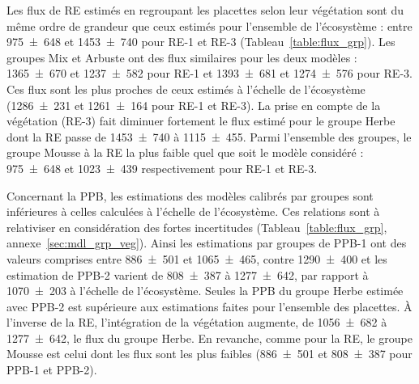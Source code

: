 Les flux de RE estimés en regroupant les placettes selon leur végétation sont du même ordre de grandeur que ceux estimés pour l'ensemble de l'écosystème : entre \num{975(648)} et \SI{1453(740)}{\gcma} pour RE-1 et RE-3 (Tableau~\ref{table:flux_grp}).
Les groupes Mix et Arbuste ont des flux similaires pour les deux modèles : \num{1365(670)} et \SI{1237(582)}{\gcma} pour RE-1 et \num{1393(681)} et \SI{1274(576)}{\gcma} pour RE-3.
Ces flux sont les plus proches de ceux estimés à l'échelle de l'écosystème (\num{1286(231)} et \SI{1261(164)}{\gcma} pour RE-1 et RE-3).
La prise en compte de la végétation (RE-3) fait diminuer fortement le flux estimé pour le groupe Herbe dont la RE passe de \num{1453(740)} à \SI{1115(455)}{\gcma}.
Parmi l'ensemble des groupes, le groupe Mousse à la RE la plus faible quel que soit le modèle considéré : \num{975(648)} et \SI{1023(439)}{\gcma} respectivement pour RE-1 et RE-3.

Concernant la PPB, les estimations des modèles calibrés par groupes sont inférieures à celles calculées à l'échelle de l'écosystème.
Ces relations sont à relativiser en considération des fortes incertitudes (Tableau~\ref{table:flux_grp}, annexe~\ref{sec:mdl_grp_veg}).
Ainsi les estimations par groupes de PPB-1 ont des valeurs comprises entre \num{886(501)} et \SI{1065(465)}{\gcma}, contre \SI{1290(400)}{\gcma} et les estimation de PPB-2 varient de \num{808(387)} à \SI{1277(642)}{\gcma}, par rapport à \SI{1070(203)}{\gcma} à l'échelle de l'écosystème.
Seules la PPB du groupe Herbe estimée avec PPB-2 est supérieure aux estimations faites pour l'ensemble des placettes.
À l'inverse de la RE, l'intégration de la végétation augmente, de \num{1056(682)} à \SI{1277(642)}{\gcma}, le flux du groupe Herbe.
En revanche, comme pour la RE, le groupe Mousse est celui dont les flux sont les plus faibles (\num{886(501)} et \SI{808(387)}{\gcma} pour PPB-1 et PPB-2).


